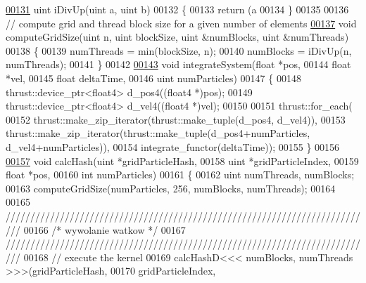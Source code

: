 \begin{DoxyCode}
\hypertarget{particle_system__cuda_8cu_source_l00131}{}\hyperlink{particle_system__cuda_8cu_aa5accec7fb28381615c8cb68522c9eb3}{00131}     uint iDivUp(uint a, uint b)
00132     \{
00133         \textcolor{keywordflow}{return} (a %
00134     \}
00135 
00136     \textcolor{comment}{// compute grid and thread block size for a given number of elements}
\hypertarget{particle_system__cuda_8cu_source_l00137}{}\hyperlink{particle_system__cuda_8cu_a78e8aa50e0629b57cff219a2fa753ed0}{00137}     \textcolor{keywordtype}{void} computeGridSize(uint n, uint blockSize, uint &numBlocks, uint &numThreads)
00138     \{
00139         numThreads = min(blockSize, n);
00140         numBlocks = iDivUp(n, numThreads);
00141     \}
00142 
\hypertarget{particle_system__cuda_8cu_source_l00143}{}\hyperlink{particle_system__cuda_8cu_a34e9db8b801cd537e5ae5a4a886e020c}{00143}     \textcolor{keywordtype}{void} integrateSystem(\textcolor{keywordtype}{float} *pos,
00144                          \textcolor{keywordtype}{float} *vel,
00145                          \textcolor{keywordtype}{float} deltaTime,
00146                          uint numParticles)
00147     \{
00148         thrust::device\_ptr<float4> d\_pos4((float4 *)pos);
00149         thrust::device\_ptr<float4> d\_vel4((float4 *)vel);
00150 
00151         thrust::for\_each(
00152             thrust::make\_zip\_iterator(thrust::make\_tuple(d\_pos4, d\_vel4)),
00153             thrust::make\_zip\_iterator(thrust::make\_tuple(d\_pos4+numParticles, d\_vel4+numParticles)),
00154             integrate\_functor(deltaTime));
00155     \}
00156 
\hypertarget{particle_system__cuda_8cu_source_l00157}{}\hyperlink{particle_system__cuda_8cu_ae0a4037d25e768622443077546399cf2}{00157}     \textcolor{keywordtype}{void} calcHash(uint  *gridParticleHash,
00158                   uint  *gridParticleIndex,
00159                   \textcolor{keywordtype}{float} *pos,
00160                   \textcolor{keywordtype}{int}    numParticles)
00161     \{
00162         uint numThreads, numBlocks;
00163         computeGridSize(numParticles, 256, numBlocks, numThreads);
00164 
00165 \textcolor{comment}{///////////////////////////////////////////////////////////////////////////}
00166 \textcolor{comment}{/*      wywolanie watkow        */}
00167 \textcolor{comment}{///////////////////////////////////////////////////////////////////////////}
00168         \textcolor{comment}{// execute the kernel}
00169         calcHashD<<< numBlocks, numThreads >>>(gridParticleHash,
00170                                                gridParticleIndex,

\end{DoxyCode}
